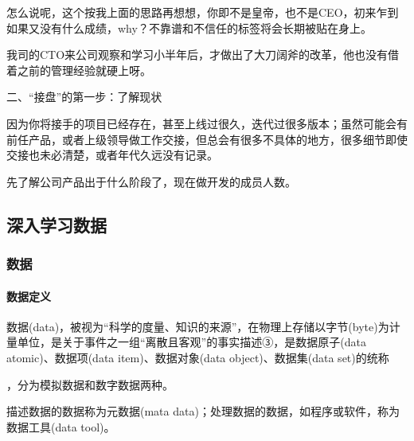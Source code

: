 \documentclass[letterpaper,10pt,english]{sphinxmanual}
\begin{document}
怎么说呢，这个按我上面的思路再想想，你即不是皇帝，也不是CEO，初来乍到如果又没有什么成绩，why？不靠谱和不信任的标签将会长期被贴在身上。

我司的CTO来公司观察和学习小半年后，才做出了大刀阔斧的改革，他也没有借着之前的管理经验就硬上呀。

二、“接盘”的第一步：了解现状

因为你将接手的项目已经存在，甚至上线过很久，迭代过很多版本；虽然可能会有前任产品，或者上级领导做工作交接，但总会有很多不具体的地方，很多细节即使交接也未必清楚，或者年代久远没有记录。

先了解公司产品出于什么阶段了，现在做开发的成员人数。%
\begin{footnote}[902]\sphinxAtStartFootnote
{}
%
\end{footnote}


\subsection{深入学习数据}
\label{\detokenize{chapter_data_dive/index:chap-more}}\label{\detokenize{chapter_data_dive/index:id1}}\label{\detokenize{chapter_data_dive/index::doc}}

\subsubsection{数据}
\label{\detokenize{chapter_data_dive/data:id1}}\label{\detokenize{chapter_data_dive/data::doc}}

\paragraph{数据定义}
\label{\detokenize{chapter_data_dive/data:id2}}
数据(data)，被视为“科学的度量、知识的来源”，在物理上存储以字节(byte)为计量单位，是关于事件之一组“离散且客观”的事实描述③，是数据原子(data
atomic)、数据项(data item)、数据对象(data object)、数据集(data
set)的统称%
\begin{footnote}[903]\sphinxAtStartFootnote
{}
%
\end{footnote}，分为模拟数据和数字数据两种。

描述数据的数据称为元数据(mata
data)；处理数据的数据，如程序或软件，称为数据工具(data tool)。
\end{document}
